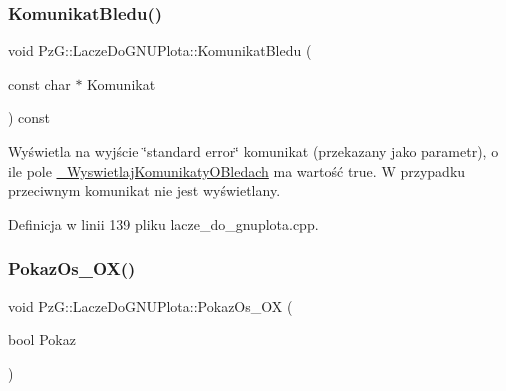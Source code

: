 \mbox{\label{class_pz_g_1_1_lacze_do_g_n_u_plota_a90056743aeaa546721528005f2cf41e6}} 
\subsubsection{\texorpdfstring{Komunikat\+Bledu()}{KomunikatBledu()}}
{\footnotesize\ttfamily void Pz\+G\+::\+Lacze\+Do\+G\+N\+U\+Plota\+::\+Komunikat\+Bledu (\begin{DoxyParamCaption}\item[{const char $\ast$}]{Komunikat }\end{DoxyParamCaption}) const\hspace{0.3cm}{\ttfamily [protected]}}

Wyświetla na wyjście \char`\"{}standard error\char`\"{} komunikat (przekazany jako parametr), o ile pole \hyperlink{class_pz_g_1_1_lacze_do_g_n_u_plota_a2f2800f14ebfe1caef0b4d30c410a7fe}{\+\_\+\+Wyswietlaj\+Komunikaty\+O\+Bledach} ma wartość {\ttfamily true}. W przypadku przeciwnym komunikat nie jest wyświetlany. 

Definicja w linii 139 pliku lacze\+\_\+do\+\_\+gnuplota.\+cpp.

\mbox{\label{class_pz_g_1_1_lacze_do_g_n_u_plota_a11421d7c67deab6b7524cc492407e897}} 
\subsubsection{\texorpdfstring{Pokaz\+Os\+\_\+\+O\+X()}{PokazOs\_OX()}\hspace{0.1cm}{\footnotesize\ttfamily [1/2]}}
{\footnotesize\ttfamily void Pz\+G\+::\+Lacze\+Do\+G\+N\+U\+Plota\+::\+Pokaz\+Os\+\_\+\+OX (\begin{DoxyParamCaption}\item[{bool}]{Pokaz }\end{DoxyParamCaption})\hspace{0.3cm}{\ttfamily [inline]}}



